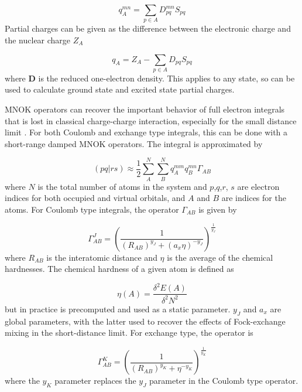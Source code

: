 \begin{equation}
q^{mn}_A = \sum_{p \in A} D^{mn}_{pq} S_{pq}  
\end{equation}
%
Partial charges can be given as the difference between the electronic charge
and the nuclear charge $Z_A$

\begin{equation}
q_A = Z_A - \sum_{p \in A} D_{pq} S_{pq}  
\end{equation}
%
where $\mathbf{D}$ is the reduced one-electron density. This applies to any state,
so can be used to calculate ground state and excited state partial charges.

MNOK operators can recover the important behavior of full electron integrals that
is lost in classical charge-charge interaction, especially for the small distance limit \cite{Grimme2016}.
For both Coulomb and exchange type integrals, this can be done with a short-range
damped MNOK operators. The integral is approximated by

\begin{equation}
\left(pq|rs\right) \approx \frac{1}{2}\sum^N_A \sum^N_B q_A^{mm} q_B^{mn} \Gamma_{AB}
\end{equation}
%
where $N$ is the total number of atoms in the system and $p$,$q$,$r$, $s$ are electron
indices for both occupied and virtual orbitals, and $A$ and $B$ are indices for
 the atoms. For Coulomb type integrals, the operator $\Gamma_{AB}$ is given by

\begin{equation}
\Gamma^J_{AB} = \left(\frac{1}{\left(R_{AB}\right)^{y_J} + \left(a_x \eta\right)^{-y_J}} \right)^{\frac{1}{y_J}}
\end{equation}
%
where $R_{AB}$ is the interatomic distance and $\eta$ is the average of the chemical 
hardnesses. The chemical hardness of a given atom is defined as

\begin{equation}
\eta\left(A\right) = \frac{\delta^2 E\left(A\right)}{\delta^2 N^2}
\end{equation}
%
but in practice is precomputed and used as a static parameter. $y_J$ and $a_x$ are
global parameters, with the latter used to recover the effects of Fock-exchange
mixing in the short-distance limit. For exchange type, the operator is

\begin{equation}
\Gamma^K_{AB} = \left(\frac{1}{\left(R_{AB}\right)^{y_K} + \eta^{-y_K}} \right)^{\frac{1}{y_K}}
\end{equation}
%
where the $y_K$ parameter replaces the $y_J$ parameter in the Coulomb type operator.

